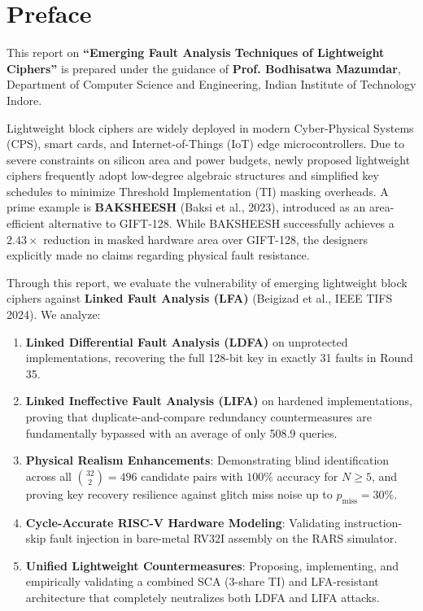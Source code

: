 \cleardoublepage

\chapter*{Preface}

This report on \textbf{``Emerging Fault Analysis Techniques of Lightweight Ciphers''} is prepared under the guidance of \textbf{Prof. Bodhisatwa Mazumdar}, Department of Computer Science and Engineering, Indian Institute of Technology Indore.

Lightweight block ciphers are widely deployed in modern Cyber-Physical Systems (CPS), smart cards, and Internet-of-Things (IoT) edge microcontrollers. Due to severe constraints on silicon area and power budgets, newly proposed lightweight ciphers frequently adopt low-degree algebraic structures and simplified key schedules to minimize Threshold Implementation (TI) masking overheads. A prime example is \textbf{BAKSHEESH} (Baksi et al., 2023), introduced as an area-efficient alternative to GIFT-128. While BAKSHEESH successfully achieves a $2.43\times$ reduction in masked hardware area over GIFT-128, the designers explicitly made no claims regarding physical fault resistance.

Through this report, we evaluate the vulnerability of emerging lightweight block ciphers against \textbf{Linked Fault Analysis (LFA)} (Beigizad et al., IEEE TIFS 2024). We analyze:
\begin{enumerate}
    \item \textbf{Linked Differential Fault Analysis (LDFA)} on unprotected implementations, recovering the full 128-bit key in exactly 31 faults in Round 35.
    \item \textbf{Linked Ineffective Fault Analysis (LIFA)} on hardened implementations, proving that duplicate-and-compare redundancy countermeasures are fundamentally bypassed with an average of only 508.9 queries.
    \item \textbf{Physical Realism Enhancements}: Demonstrating blind identification across all $\binom{32}{2} = 496$ candidate pairs with $100\%$ accuracy for $N \ge 5$, and proving key recovery resilience against glitch miss noise up to $p_{\text{miss}} = 30\%$.
    \item \textbf{Cycle-Accurate RISC-V Hardware Modeling}: Validating instruction-skip fault injection in bare-metal RV32I assembly on the RARS simulator.
    \item \textbf{Unified Lightweight Countermeasures}: Proposing, implementing, and empirically validating a combined SCA (3-share TI) and LFA-resistant architecture that completely neutralizes both LDFA and LIFA attacks.
\end{enumerate}

